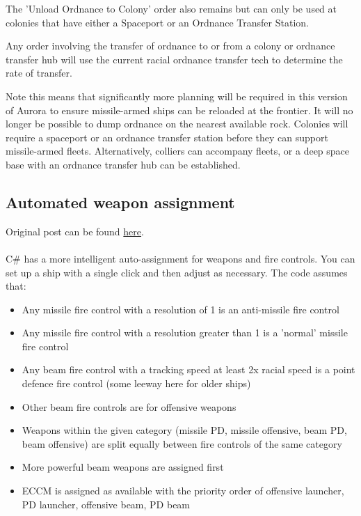 \documentclass[../Aurora C# unofficial manual.tex]{subfiles}
\begin{document}
	The 'Unload Ordnance to Colony' order also remains but can only be used at colonies that have either a Spaceport or an Ordnance Transfer Station.
	
	Any order involving the transfer of ordnance to or from a colony or ordnance transfer hub will use the current racial ordnance transfer tech to determine the rate of transfer.
	
	Note this means that significantly more planning will be required in this version of Aurora to ensure missile-armed ships can be reloaded at the frontier. It will no longer be possible to dump ordnance on the nearest available rock. Colonies will require a spaceport or an ordnance transfer station before they can support missile-armed fleets. Alternatively, colliers can accompany fleets, or a deep space base with an ordnance transfer hub can be established.
	
	
	\subsection{Automated weapon assignment}
	Original post can be found
	\href{http://aurora2.pentarch.org/index.php?topic=8495.msg107378#msg107378}{here}.
	\\\\
	
	C\# has a more intelligent auto-assignment for weapons and fire controls. You can set up a ship with a single click and then adjust as necessary. The code assumes that:
	\begin{itemize}
		\item Any missile fire control with a resolution of 1 is an anti-missile fire control
		\item Any missile fire control with a resolution greater than 1 is a 'normal' missile fire control
		\item Any beam fire control with a tracking speed at least 2x racial speed is a point defence fire control (some leeway here for older ships)
		\item Other beam fire controls are for offensive weapons
		\item Weapons within the given category (missile PD, missile offensive, beam PD, beam offensive) are split equally between fire controls of the same category
		\item More powerful beam weapons are assigned first
		\item ECCM is assigned as available with the priority order of offensive launcher, PD launcher, offensive beam, PD beam
	\end{itemize}
\end{document}

